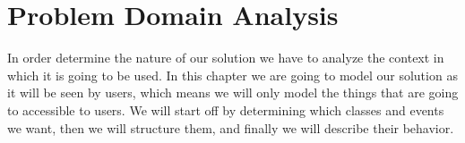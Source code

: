 \chapter{Problem Domain Analysis}
In order determine the nature of our solution we have to analyze the context in which it is going to be used. In this chapter we are going to model our solution as it will be seen by users, which means we will only model the things that are going to accessible to users. We will start off by determining which classes and events we want, then we will structure them, and finally we will describe their behavior. 


